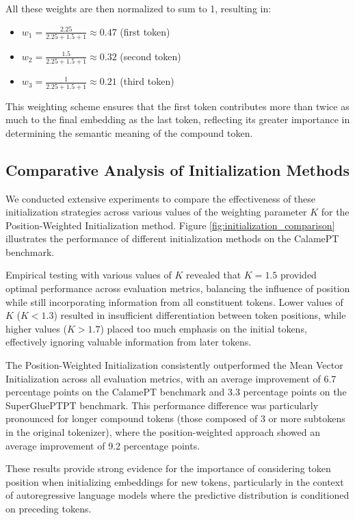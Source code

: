 All these weights are then normalized to sum to 1, resulting in:
\begin{itemize}
    \item $w_1 = \frac{2.25}{2.25+1.5+1} \approx 0.47$ (first token)
    \item $w_2 = \frac{1.5}{2.25+1.5+1}  \approx 0.32$ (second token)
    \item $w_3 = \frac{1}{2.25+1.5+1}    \approx 0.21$ (third token)
\end{itemize}
This weighting scheme ensures that the first token contributes more than twice as much to the final embedding as the last token, reflecting its greater importance in determining the semantic meaning of the compound token.

\subsection{Comparative Analysis of Initialization Methods}
We conducted extensive experiments to compare the effectiveness of these initialization strategies across various values of the weighting parameter $K$ for the Position-Weighted Initialization method. Figure \ref{fig:initialization_comparison} illustrates the performance of different initialization methods on the CalamePT benchmark.

Empirical testing with various values of $K$ revealed that $K = 1.5$ provided optimal performance across evaluation metrics, balancing the influence of position while still incorporating information from all constituent tokens. Lower values of $K$ ($K < 1.3$) resulted in insufficient differentiation between token positions, while higher values ($K > 1.7$) placed too much emphasis on the initial tokens, effectively ignoring valuable information from later tokens.

The Position-Weighted Initialization consistently outperformed the Mean Vector Initialization across all evaluation metrics, with an average improvement of 6.7 percentage points on the CalamePT benchmark and 3.3 percentage points on the SuperGluePTPT benchmark. This performance difference was particularly pronounced for longer compound tokens (those composed of 3 or more subtokens in the original tokenizer), where the position-weighted approach showed an average improvement of 9.2 percentage points.

These results provide strong evidence for the importance of considering token position when initializing embeddings for new tokens, particularly in the context of autoregressive language models where the predictive distribution is conditioned on preceding tokens.
